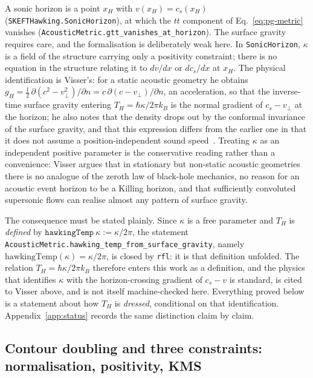 \documentclass[aps,prd,reprint,nofootinbib,superscriptaddress]{revtex4-2}
\begin{document}
A sonic horizon is a point $x_H$ with $v(x_H) = c_s(x_H)$
(\texttt{SKEFTHawking.SonicHorizon}), at which the $tt$ component of
Eq.~\eqref{eq:pg-metric} vanishes
(\texttt{AcousticMetric.gtt\_vanishes\_at\_horizon}). The surface gravity
requires care, and the formalisation is deliberately weak here. In
\texttt{SonicHorizon}, $\kappa$ is a field of the structure carrying only
a positivity constraint; there is no equation in the structure relating
it to $dv/dx$ or $dc_s/dx$ at $x_H$. The physical identification is
Visser's: for a static acoustic geometry he obtains
$g_H = \tfrac{1}{2}\,\partial(c^{2}-v_\perp^{2})/\partial n
= c\,\partial(c-v_\perp)/\partial n$, an acceleration, so that the
inverse-time surface gravity entering $T_H = \hbar\kappa/2\pi k_B$ is the
normal gradient of $c_s - v_\perp$ at the horizon; he also notes that the
density drops out by the conformal invariance of the surface gravity, and
that this expression differs from the earlier one in that it does not
assume a position-independent sound speed~\cite{Visser1998}.
Treating $\kappa$ as an independent positive parameter is the
conservative reading rather than a convenience: Visser argues that in
stationary but non-static acoustic geometries there is no analogue of the
zeroth law of black-hole mechanics, no reason for an acoustic event
horizon to be a Killing horizon, and that sufficiently convoluted
supersonic flows can realise almost any pattern of surface gravity.

The consequence must be stated plainly. Since $\kappa$ is a free
parameter and $T_H$ is \emph{defined} by
$\texttt{hawkingTemp}\ \kappa := \kappa/2\pi$, the statement
\texttt{AcousticMetric.hawking\_temp\_from\_surface\_gravity}, namely
$\mathrm{hawkingTemp}(\kappa) = \kappa/2\pi$, is closed by \texttt{rfl}:
it is that definition unfolded. The relation
$T_H = \hbar\kappa/2\pi k_B$ therefore enters this work as a definition,
and the physics that identifies $\kappa$ with the horizon-crossing
gradient of $c_s - v$ is standard, is cited to Visser above, and is not
itself machine-checked here. Everything proved below is a statement about
how $T_H$ is \emph{dressed}, conditional on that identification.
Appendix~\ref{app:status} records the same distinction claim by claim.

\subsection{Contour doubling and three constraints: normalisation,
positivity, KMS}
\label{sec:eft-sk}
\end{document}
